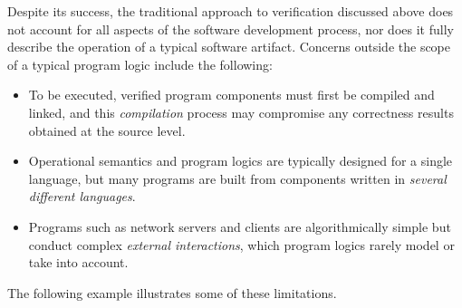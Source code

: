 \documentclass[acmsmall,nonacm]{acmart}
\begin{document}
Despite its success,
the traditional approach to verification
discussed above
does not account for all aspects of the software development process,
nor does it fully describe
the operation of a typical software artifact.
Concerns outside the scope of a typical program logic include the following:
\begin{itemize}
  \item To be executed,
    verified program components must first be compiled and linked,
    and this \emph{compilation} process may compromise
    any correctness results obtained at the source level.
  \item Operational semantics and program logics
    are typically designed for a single language, but
    many programs are built from components written
    in \emph{several different languages}.
  \item Programs such as network servers and clients
    are algorithmically simple
    but conduct complex \emph{external interactions},
    which program logics rarely model or take into account.
\end{itemize}
The following example illustrates some of these limitations.
\end{document}
